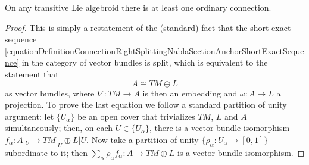 \begin{theorem}
On any transitive Lie algebroid there is at least one ordinary connection.
\end{theorem}
\begin{proof}
This is simply a restatement of the (standard) fact that the short exact sequence \eqref{equationDefinitionConnectionRightSplittingNablaSectionAnchorShortExactSequence} in the category of vector bundles is split, which is equivalent to the statement that \begin{equation}
    A \cong TM \oplus L
\end{equation}
as vector bundles, where $\nabla: TM \to A$ is then an embedding and $\omega: A \to L$ a projection. To prove the last equation we follow a standard partition of unity argument: let $\{U_\alpha\}$ be an open cover that trivializes $TM$, $L$ and $A$ simultaneously; then, on each $U \in \{U_\alpha\}$, there is a vector bundle isomorphism $f_\alpha: A|_U \to TM|_U \oplus L|U$. Now take a partition of unity $\{\rho_\alpha:U_\alpha \to [0,1]\}$ subordinate to it; then $\sum_\alpha \rho_\alpha f_\alpha : A \to TM \oplus L$ is a vector bundle isomorphism.

\end{proof}


